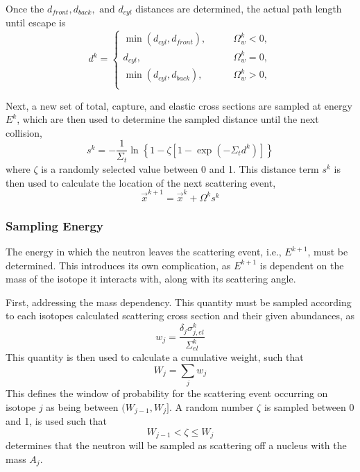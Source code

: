 Once the $d_{front}, d_{back}, \text{ and } d_{cyl}$ distances are determined, the actual path length until escape is
\begin{equation}
    d^k =
    \begin{cases}
        \min{ \left( d_{cyl}, d_{front} \right)},   \qquad &\Omega_{w}^k < 0,\\
        d_{cyl},                                    \qquad &\Omega_{w}^k = 0, \\
        \min{ \left( d_{cyl}, d_{back} \right)},    \qquad &\Omega_{w}^k > 0,\\
    \end{cases}
\end{equation}

Next, a new set of total, capture, and elastic cross sections are sampled at energy $E^k$, which are then used to determine the sampled distance until the next collision,
\begin{equation}
    \label{eq:free-path-sampling}
    s^k = -\frac{1}{\Sigma_{t}} \ln{\left\{
        1 - \zeta \left[ 1 - \exp{\left( -\Sigma_t d^k \right)} \right]
    \right\}}
\end{equation}
where $\zeta$ is a randomly selected value between 0 and 1. This distance term $s^{k}$ is then used to calculate the location of the next scattering event,
\begin{equation}
    \label{eq:sampling-new-location}
    \overrightarrow{x}^{k+1} = \overrightarrow{x}^{k} + \Omega^{k}s^{k}
\end{equation}

\subsubsection{Sampling Energy}
\label{sec:sampling-energy-ms}
The energy in which the neutron leaves the scattering event, i.e., $E^{k+1}$, must be determined. This introduces its own complication, as $E^{k+1}$ is dependent on the mass of the isotope it interacts with, along with its scattering angle. 

First, addressing the mass dependency. This quantity must be sampled according to each isotopes calculated scattering cross section and their given abundances, as
\begin{equation}
    w_{j} = \frac{\delta_j \sigma_{j,el}^{k} }{\Sigma_{el}^k}
\end{equation}
This quantity is then used to calculate a cumulative weight, such that
\begin{equation}
    W_j = \sum_{j} w_j
\end{equation}
This defines the window of probability for the scattering event occurring on isotope $j$ as being between $(W_{j-1}, W_{j}]$.
A random number $\zeta$ is sampled between 0 and 1, is used such that
\begin{equation}
    W_{j-1} < \zeta \leq W_{j}
\end{equation}
determines that the neutron will be sampled as scattering off a nucleus with the mass $A_j$.

